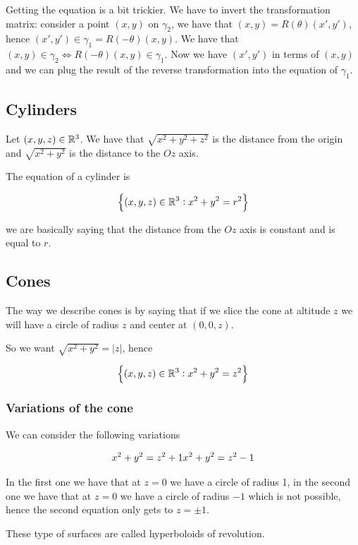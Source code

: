 \documentclass[10pt]{extarticle}
\begin{document}
Getting the equation is a bit trickier.
We have to invert the transformation matrix:
consider a point $(x, y)$ on $\gamma_2$, we have that $(x, y) = R(\theta) (x', y')$, hence $(x', y') \in \gamma_1 = R(-\theta) (x, y)$.
We have that $(x,y) \in \gamma_2 \iff R(-\theta)(x, y) \in \gamma_1$.
Now we have $(x', y')$ in terms of $(x, y)$ and we can plug the result of the reverse transformation into the equation of $\gamma_1$.

\subsection{Cylinders}

Let $(x, y, z) \in \mathbb{R}^3$. We have that $\sqrt{x^2 + y^2 + z^2}$ is the distance from the origin and $\sqrt{x^2 + y^2}$ is the distance to the $Oz$ axis.

The equation of a cylinder is

$$
    \left\{ (x, y, z) \in \mathbb{R}^3  : x^2 + y^2 = r^2\right\}
$$

we are basically saying that the distance from the $Oz$ axis is constant and is equal to $r$.

\subsection{Cones}

The way we describe cones is by saying that if we slice the cone at altitude $z$ we will have a circle of radius $z$ and center at $(0,0,z)$.

So we want $\sqrt{x^2 + y^2} = |z|$, hence

$$
    \left\{ (x, y, z) \in \mathbb{R}^3 : x^2 + y^2 = z^2 \right\}
$$

\subsubsection{Variations of the cone}

We can consider the following variations

$$
    x^2 + y^2 = z^2 + 1 \\
    x^2 + y^2 = z^2 - 1
$$

In the first one we have that at $z=0$ we have a circle of radius 1, in the second one we have that at $z=0$ we have a circle of radius $-1$ which is not possible, hence the second equation only gets to $z = \pm 1$.

These type of surfaces are called hyperboloids of revolution.
\end{document}
